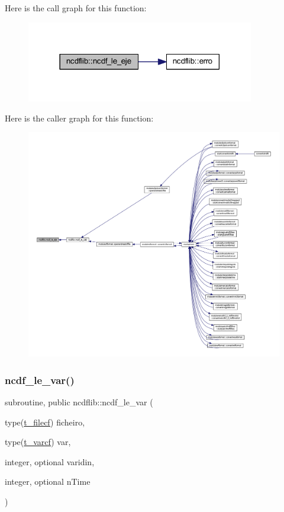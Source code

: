 Here is the call graph for this function\+:\nopagebreak
\begin{figure}[H]
\begin{center}
\leavevmode
\includegraphics[width=282pt]{namespacencdflib_a6381f85426e3ba879b031f6feae929c1_cgraph}
\end{center}
\end{figure}
Here is the caller graph for this function\+:\nopagebreak
\begin{figure}[H]
\begin{center}
\leavevmode
\includegraphics[width=350pt]{namespacencdflib_a6381f85426e3ba879b031f6feae929c1_icgraph}
\end{center}
\end{figure}
\mbox{\label{namespacencdflib_ac0842e227620b638b2a5474d6e1b441f}} 
\subsubsection{\texorpdfstring{ncdf\+\_\+le\+\_\+var()}{ncdf\_le\_var()}}
{\footnotesize\ttfamily subroutine, public ncdflib\+::ncdf\+\_\+le\+\_\+var (\begin{DoxyParamCaption}\item[{type(\mbox{\hyperlink{structncdflib_1_1t__filecf}{t\+\_\+filecf}})}]{ficheiro,  }\item[{type(\mbox{\hyperlink{structncdflib_1_1t__varcf}{t\+\_\+varcf}})}]{var,  }\item[{integer, optional}]{varidin,  }\item[{integer, optional}]{n\+Time }\end{DoxyParamCaption})}


